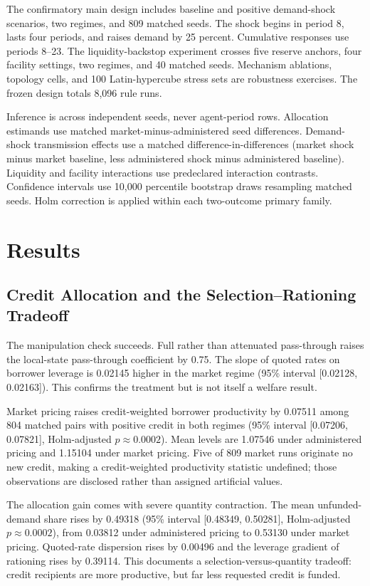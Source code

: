 \documentclass[11pt,a4paper]{article}
\begin{document}
The confirmatory main design includes baseline and positive demand-shock scenarios, two regimes, and 809 matched seeds. The shock begins in period 8, lasts four periods, and raises demand by 25 percent. Cumulative responses use periods 8--23. The liquidity-backstop experiment crosses five reserve anchors, four facility settings, two regimes, and 40 matched seeds. Mechanism ablations, topology cells, and 100 Latin-hypercube stress sets are robustness exercises. The frozen design totals 8,096 rule runs.

Inference is across independent seeds, never agent-period rows. Allocation estimands use matched market-minus-administered seed differences. Demand-shock transmission effects use a matched difference-in-differences (market shock minus market baseline, less administered shock minus administered baseline). Liquidity and facility interactions use predeclared interaction contrasts. Confidence intervals use 10,000 percentile bootstrap draws resampling matched seeds. Holm correction is applied within each two-outcome primary family.

\section{Results}

\subsection{Credit Allocation and the Selection--Rationing Tradeoff}

The manipulation check succeeds. Full rather than attenuated pass-through raises the local-state pass-through coefficient by 0.75. The slope of quoted rates on borrower leverage is 0.02145 higher in the market regime (95\% interval [0.02128, 0.02163]). This confirms the treatment but is not itself a welfare result.

Market pricing raises credit-weighted borrower productivity by 0.07511 among 804 matched pairs with positive credit in both regimes (95\% interval [0.07206, 0.07821], Holm-adjusted $p \approx 0.0002$). Mean levels are 1.07546 under administered pricing and 1.15104 under market pricing. Five of 809 market runs originate no new credit, making a credit-weighted productivity statistic undefined; those observations are disclosed rather than assigned artificial values.

The allocation gain comes with severe quantity contraction. The mean unfunded-demand share rises by 0.49318 (95\% interval [0.48349, 0.50281], Holm-adjusted $p \approx 0.0002$), from 0.03812 under administered pricing to 0.53130 under market pricing. Quoted-rate dispersion rises by 0.00496 and the leverage gradient of rationing rises by 0.39114. This documents a selection-versus-quantity tradeoff: credit recipients are more productive, but far less requested credit is funded.
\end{document}
